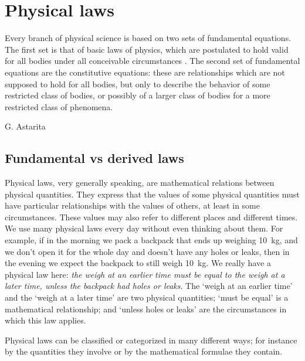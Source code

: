\documentclass[a4paper,12pt,%
onecolumn,oneside,%
british%
]{memoir}
\renewcommand*{\|}[1][]{\nonscript\:#1\vert\nonscript\:\mathopen{}}
\begin{document}
\printpagenotes*
\clearpage
\chapter{Physical laws}
\label{cha:laws}


\epigraph{Every branch of physical science is based on two sets of fundamental equations. The first set is that of basic laws of physics, which are postulated to hold valid for all bodies under all conceivable circumstances \textelp{}. The second set of fundamental equations are the constitutive equations: these are relationships which are not supposed to hold for all bodies, but only to describe the behavior of some restricted class of bodies, or possibly of a larger class of bodies for a more restricted class of phenomena.}{G. Astarita \cites*{astarita1989_r1990}}

\section{Fundamental vs derived laws}
\label{sec:fundamental_derived}

Physical laws, very generally speaking, are mathematical relations between physical quantities. They express that the values of some physical quantities must have particular relationships with the values of others, at least in some circumstances. These values may also refer to different places and different times. We use many physical laws every day without even thinking about them. For example, if in the morning we pack a backpack that ends up weighing \qty{10}{kg}, and we don't open it for the whole day and doesn't have any holes or leaks, then in the evening we expect the backpack to still weigh \qty{10}{kg}. We really have a physical law here: \emph{the weigh at an earlier time must be equal to the weigh at a later time, unless the backpack had holes or leaks}. The \enquote*{weigh at an earlier time} and the \enquote*{weigh at a later time} are two physical quantities; \enquote*{must be equal} is a mathematical relationship; and \enquote*{unless holes or leaks} are the circumstances in which this law applies.

Physical laws can be classified or categorized in many different ways; for instance by the quantities they involve or by the mathematical formulae they contain.
\end{document}
